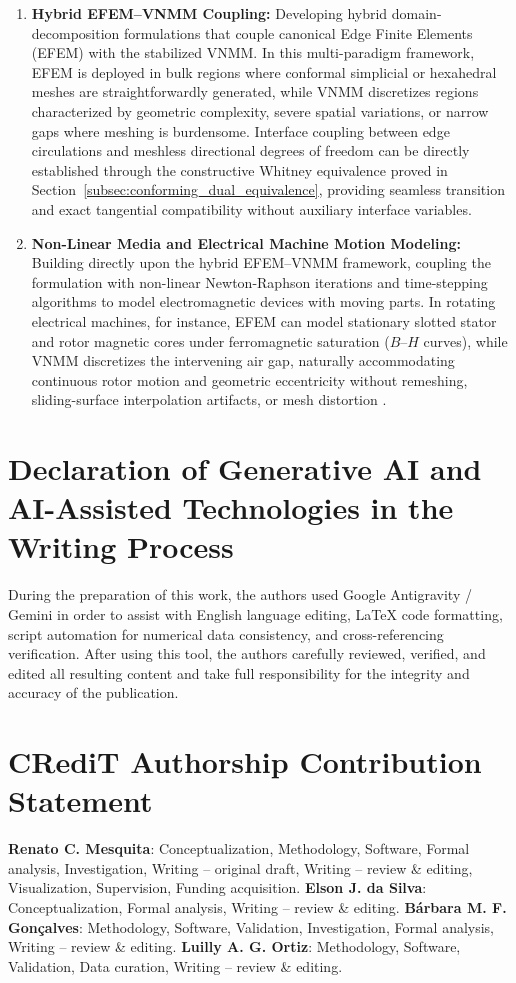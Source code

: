 \documentclass[preprint,12pt]{elsarticle}
\begin{document}
\begin{enumerate}
    \item \textbf{Hybrid EFEM--VNMM Coupling:}
          Developing hybrid domain-decomposition formulations that couple canonical Edge Finite Elements (EFEM) with the stabilized VNMM. In this multi-paradigm framework, EFEM is deployed in bulk regions where conformal simplicial or hexahedral meshes are straightforwardly generated, while VNMM discretizes regions characterized by geometric complexity, severe spatial variations, or narrow gaps where meshing is burdensome. Interface coupling between edge circulations and meshless directional degrees of freedom can be directly established through the constructive Whitney equivalence proved in Section~\ref{subsec:conforming_dual_equivalence}, providing seamless transition and exact tangential compatibility without auxiliary interface variables.

    \item \textbf{Non-Linear Media and Electrical Machine Motion Modeling:}
          Building directly upon the hybrid EFEM--VNMM framework, coupling the formulation with non-linear Newton-Raphson iterations and time-stepping algorithms to model electromagnetic devices with moving parts. In rotating electrical machines, for instance, EFEM can model stationary slotted stator and rotor magnetic cores under ferromagnetic saturation ($B\text{--}H$ curves), while VNMM discretizes the intervening air gap, naturally accommodating continuous rotor motion and geometric eccentricity without remeshing, sliding-surface interpolation artifacts, or mesh distortion \cite{coppoli2012induction}.
\end{enumerate}


\section*{Declaration of Generative AI and AI-Assisted Technologies in the Writing Process}
During the preparation of this work, the authors used Google Antigravity / Gemini in order to assist with English language editing, LaTeX code formatting, script automation for numerical data consistency, and cross-referencing verification. After using this tool, the authors carefully reviewed, verified, and edited all resulting content and take full responsibility for the integrity and accuracy of the publication.

\section*{CRediT Authorship Contribution Statement}
\textbf{Renato C. Mesquita}: Conceptualization, Methodology, Software, Formal analysis, Investigation, Writing -- original draft, Writing -- review \& editing, Visualization, Supervision, Funding acquisition.
\textbf{Elson J. da Silva}: Conceptualization, Formal analysis, Writing -- review \& editing.
\textbf{Bárbara M. F. Gonçalves}: Methodology, Software, Validation, Investigation, Formal analysis, Writing -- review \& editing.
\textbf{Luilly A. G. Ortiz}: Methodology, Software, Validation, Data curation, Writing -- review \& editing.
\end{document}

